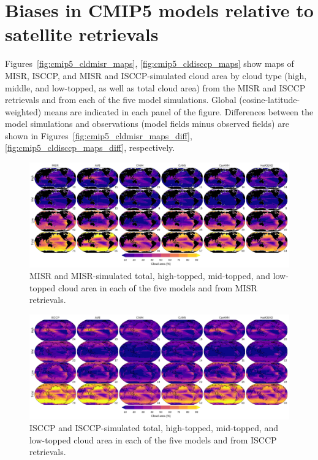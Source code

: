 \section{Biases in CMIP5 models relative to satellite
retrievals}\label{biases-in-cmip5-models-relative-to-satellite-retrievals}

Figures~\ref{fig:cmip5_cldmisr_maps}, \ref{fig:cmip5_cldisccp_maps} show
maps of MISR, ISCCP, and MISR and ISCCP-simulated cloud area by cloud
type (high, middle, and low-topped, as well as total cloud area) from
the MISR and ISCCP retrievals and from each of the five model
simulations. Global (cosine-latitude-weighted) means are indicated in
each panel of the figure. Differences between the model simulations and
observations (model fields minus observed fields) are shown in
Figures~\ref{fig:cmip5_cldmisr_maps_diff}, \ref{fig:cmip5_cldisccp_maps_diff},
respectively.

\begin{figure}[htbp]
\centering
\includegraphics{graphics/cmip5_cldmisr.pdf}
\caption{\label{fig:cmip5_cldmisr_maps}MISR and MISR-simulated total,
high-topped, mid-topped, and low-topped cloud area in each of the five
models and from MISR retrievals.}\label{fig:cmip5ux5fcldmisrux5fmaps}
\end{figure}

\begin{figure}[htbp]
\centering
\includegraphics{graphics/cmip5_cldisccp.pdf}
\caption{\label{fig:cmip5_cldisccp_maps}ISCCP and ISCCP-simulated total,
high-topped, mid-topped, and low-topped cloud area in each of the five
models and from ISCCP retrievals.}\label{fig:cmip5ux5fcldisccpux5fmaps}
\end{figure}

